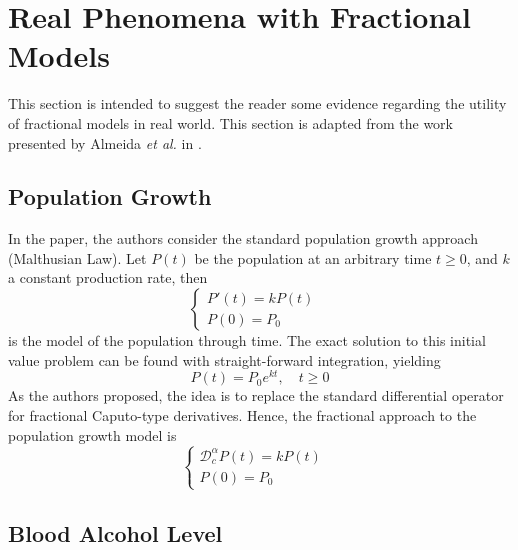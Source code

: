 \section{Real Phenomena with Fractional Models}
This section is intended to suggest the reader some evidence regarding the utility of fractional models in real world. This section is adapted from the work presented by Almeida \textit{et al.} in \cite{almeida2016modeling}.

\subsection{Population Growth}
In the paper, the authors consider the standard population growth approach (Malthusian Law). Let $P(t)$ be the population at an arbitrary time $t\geq0$, and $k$ a constant production rate, then 
\begin{equation}
    \begin{cases}
        P'(t)=kP(t)&\\
        P(0)=P_0&
    \end{cases}
\end{equation}
is the model of the population through time. The exact solution to this initial value problem can be found with straight-forward integration, yielding 
\begin{equation}
    P(t)=P_0e^{kt}, \quad t\geq0
\end{equation}
As the authors proposed, the idea is to replace the standard differential operator for fractional Caputo-type derivatives. Hence, the fractional approach to the population growth model is 
\begin{equation}
    \begin{cases}
        \mathcal{D}_c^\alpha P(t)=kP(t)&\\
        P(0)=P_0&
    \end{cases}
\end{equation}

\subsection{Blood Alcohol Level}

